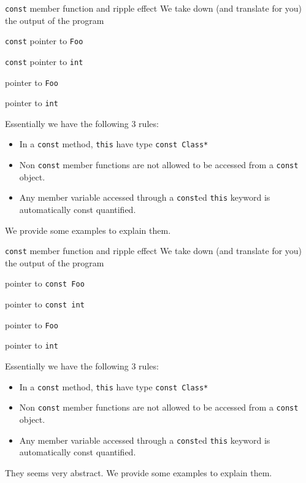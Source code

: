 \begin{frame}{\texttt{const} member function and ripple effect}
We take down (and translate for you) the output of the program
\begin{description}
	\item[\texttt{bar()::this}] \texttt{const} pointer to \texttt{Foo}
	\item[\texttt{bar()::value}] \texttt{const} pointer to \texttt{int}
	\item[\texttt{baz()::this}] pointer to \texttt{Foo}
	\item[\texttt{baz()::value}] pointer to \texttt{int}
\end{description}
Essentially we have the following 3 rules:
\begin{itemize}
	\item In a \texttt{const} method, \texttt{this} have type \texttt{const Class*}
	\item Non \texttt{const} member functions are not allowed to be accessed from a \texttt{const} object.
	\item Any member variable accessed through a \texttt{const}ed \texttt{this} keyword is automatically const quantified.
\end{itemize}
We provide some examples to explain them.
\end{frame}

\begin{frame}{\texttt{const} member function and ripple effect}
We take down (and translate for you) the output of the program
\begin{description}
	\item[\texttt{bar()::this}]  pointer to \texttt{const Foo}
	\item[\texttt{bar()::value}] pointer to \texttt{const int}
	\item[\texttt{baz()::this}] pointer to \texttt{Foo}
	\item[\texttt{baz()::value}] pointer to \texttt{int}
\end{description}
Essentially we have the following 3 rules:
\begin{itemize}
	\item In a \texttt{const} method, \texttt{this} have type \texttt{const Class*}
	\item Non \texttt{const} member functions are not allowed to be accessed from a \texttt{const} object.
	\item Any member variable accessed through a \texttt{const}ed \texttt{this} keyword is automatically const quantified.
\end{itemize}
They seems very abstract. We provide some examples to explain them.
\end{frame}

